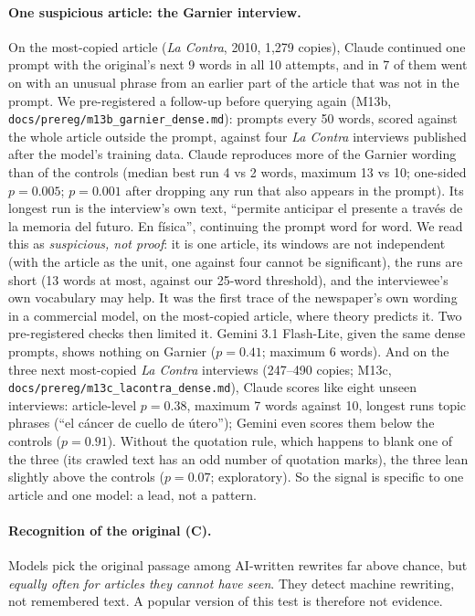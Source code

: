 \documentclass[10pt,a4paper]{article}
\begin{document}
\paragraph{One suspicious article: the Garnier interview.} On the most-copied article (\emph{La Contra}, 2010, 1,279
copies), Claude continued one prompt with the original's next 9 words in all 10 attempts, and in 7 of them went on
with an unusual phrase from an earlier part of the article that was not in the prompt. We pre-registered a follow-up
before querying again (M13b, \texttt{docs/prereg/m13b\_garnier\_dense.md}): prompts every 50 words, scored against
the whole article outside the prompt, against four \emph{La Contra} interviews published after the model's training
data. Claude reproduces more of the Garnier wording than of the controls (median best run 4 vs 2 words, maximum 13
vs 10; one-sided $p=0.005$; $p=0.001$ after dropping any run that also appears in the prompt). Its longest run is the
interview's own text, ``permite anticipar el presente a través de la memoria del futuro. En física'', continuing the
prompt word for word. We read this as \emph{suspicious, not proof}: it is one article, its windows are not
independent (with the article as the unit, one against four cannot be significant), the runs are short (13 words at
most, against our 25-word threshold), and the interviewee's own vocabulary may help. It was the first trace of the newspaper's own wording in a commercial model, on the most-copied article, where
theory predicts it. Two pre-registered checks then limited it. Gemini 3.1 Flash-Lite, given the same dense prompts,
shows nothing on Garnier ($p=0.41$; maximum 6 words). And on the three next most-copied \emph{La Contra} interviews
(247--490 copies; M13c, \texttt{docs/prereg/m13c\_lacontra\_dense.md}), Claude scores like eight unseen interviews:
article-level $p=0.38$, maximum 7 words against 10, longest runs topic phrases (``el cáncer de cuello de útero'');
Gemini even scores them below the controls ($p=0.91$).
Without the quotation rule, which happens to blank one of the three (its crawled text has an odd number of quotation
marks), the three lean slightly above the controls ($p=0.07$; exploratory). So the signal is specific to one article
and one model: a lead, not a pattern.

\paragraph{Recognition of the original (C).} Models pick the original passage among AI-written rewrites far above
chance, but \emph{equally often for articles they cannot have seen}. They detect machine rewriting, not remembered
text. A popular version of this test is therefore not evidence.
\end{document}
